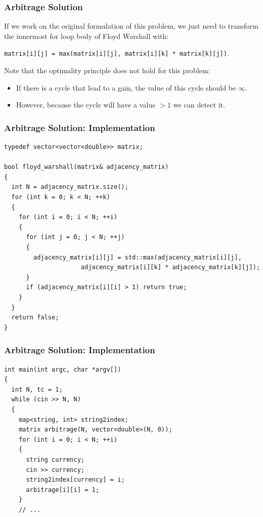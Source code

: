 \documentclass{beamer}
\begin{document}
\begin{frame}%
\frametitle{Arbitrage Solution}

If we work on the original formulation of this problem, we just need to transform the innermost for loop body of Floyd Warshall with:

\vspace{0.1cm}

\scriptsize

\begin{mdframed}[style=exampledefault]
\texttt{matrix[i][j] = max(matrix[i][j], matrix[i][k] * matrix[k][j])}.
\end{mdframed}

\normalsize

\vspace{0.5cm}


Note that the optimality principle does not hold for this problem:
\begin{itemize}

\item<2-> If there is a cycle that lead to a gain, the value of this cycle should be $\infty$.

\item<3-> However, because the cycle will have a value $> 1$ we can detect it.

\end{itemize}

\end{frame}


\begin{frame}[containsverbatim]
\frametitle{Arbitrage Solution: Implementation}

\scriptsize
\begin{lstlisting}
typedef vector<vector<double>> matrix;

bool floyd_warshall(matrix& adjacency_matrix)
{
  int N = adjacency_matrix.size();
  for (int k = 0; k < N; ++k)
  {
    for (int i = 0; i < N; ++i)
    {
      for (int j = 0; j < N; ++j)
      {
        adjacency_matrix[i][j] = std::max(adjacency_matrix[i][j],
                     adjacency_matrix[i][k] * adjacency_matrix[k][j]);
      }
      if (adjacency_matrix[i][i] > 1) return true;
    }
  }
  return false;
}
\end{lstlisting}

\end{frame}

\begin{frame}[containsverbatim]
\frametitle{Arbitrage Solution: Implementation}

\scriptsize
\begin{lstlisting}
int main(int argc, char *argv[])
{
  int N, tc = 1;
  while (cin >> N, N)
  {
    map<string, int> string2index;
    matrix arbitrage(N, vector<double>(N, 0));
    for (int i = 0; i < N; ++i)
    {
      string currency;
      cin >> currency;
      string2index[currency] = i;
      arbitrage[i][i] = 1;
    }
    // ...
\end{lstlisting}

\end{frame}
\end{document}
